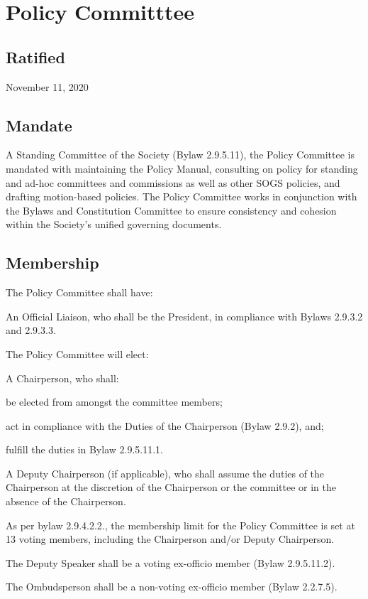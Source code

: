\section{Policy Committtee}

\subsection{Ratified}
November 11, 2020

\subsection{Mandate}
A Standing Committee of the Society (Bylaw 2.9.5.11), the Policy Committee is mandated with maintaining the Policy Manual, consulting on policy for standing and ad-hoc committees and commissions as well as other SOGS policies, and drafting motion-based policies. The Policy Committee works in conjunction with the Bylaws and Constitution Committee to ensure consistency and cohesion within the Society's unified governing documents.

\subsection{Membership}
\begin{longenum}[ label*=\thesubsection.\arabic*., align=left] 
\item The Policy Committee shall have:
	\begin{longenum}[label*=\arabic*., align=left]	
	\item An Official Liaison, who shall be the President, in compliance with Bylaws 2.9.3.2 and
2.9.3.3.
	\item The Policy Committee will elect:
		\begin{longenum}[label*=\arabic*., align=left]	
		\item A Chairperson, who shall:
			\begin{longenum}[label*=\arabic*., align=left]	
			\item be elected from amongst the committee members;
			\item act in compliance with the Duties of the Chairperson (Bylaw 2.9.2), and;
			\item fulfill the duties in Bylaw 2.9.5.11.1.
			\end{longenum}
		\item A Deputy Chairperson (if applicable), who shall assume the duties of the Chairperson at the discretion of the Chairperson or the committee or in the absence of the Chairperson.
		\end{longenum}
	\item As per bylaw 2.9.4.2.2., the membership limit for the Policy Committee is set at 13 voting members, including the Chairperson and/or Deputy Chairperson.
	\end{longenum}
\item The Deputy Speaker shall be a voting ex-officio member (Bylaw 2.9.5.11.2).
\item The Ombudsperson shall be a non-voting ex-officio member (Bylaw 2.2.7.5).
\end{longenum}

